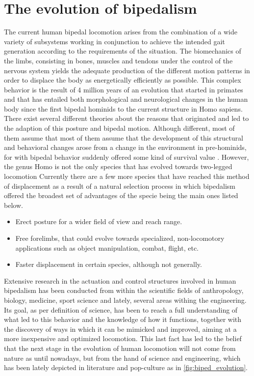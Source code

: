 \section{The evolution of bipedalism}
\label{sec:bipedalism}

The current human bipedal locomotion arises from the combination of a wide variety of subsystems working in conjunction to achieve the intended gait generation according to the requirements of the situation.
The biomechanics of the limbs, consisting in bones, muscles and tendons under the control of the nervous system yields the adequate production of the different motion patterns in order to displace the body as energetically efficiently as possible.
This complex behavior is the result of 4 million years of an evolution \cite{bipedalism2} that started in primates and that has entailed both morphological and neurological changes in the human body since the first bipedal hominids to the current structure in Homo sapiens.
There exist several different theories about the reasons that originated and led to the adaption of this posture and bipedal motion.
Although different, most of them assume that most of them assume that the development of this structural and behavioral changes arose from a change in the environment in pre-hominids, for with bipedal behavior suddenly offered some kind of survival value \cite{bipedalism1}.
However, the genus Homo is not the only species that has evolved towards two-legged locomotion
Currently there are a few more species that have reached this method of displacement as a result of a natural selection process in which bipedalism offered the broadest set of advantages of the specie being the main ones listed below. 


\begin{itemize}
	\item Erect posture for a wider field of view and reach range.
	\item Free forelimbs, that could evolve towards specialized, non-locomotory applications such as object manipulation, combat, flight, etc.
	\item Faster displacement in certain species, although not generally.
\end{itemize}

Extensive research in the actuation and control structures involved in human bipedalism has been conducted from within the scientific fields of anthropology, biology, medicine, sport science and lately, several areas withing the engineering.
Its goal, as per definition of science, has been to reach a full understanding of what led to this behavior and the knowledge of how it functions, together with the discovery of ways in which it can be mimicked and improved, aiming at a more inexpensive and optimized locomotion.
This last fact has led to the belief that the next stage in the evolution of human locomotion will not come from nature as until nowadays, but from the hand of science and engineering, which has been lately depicted in literature and pop-culture as in \ref{fig:biped_evolution}.

